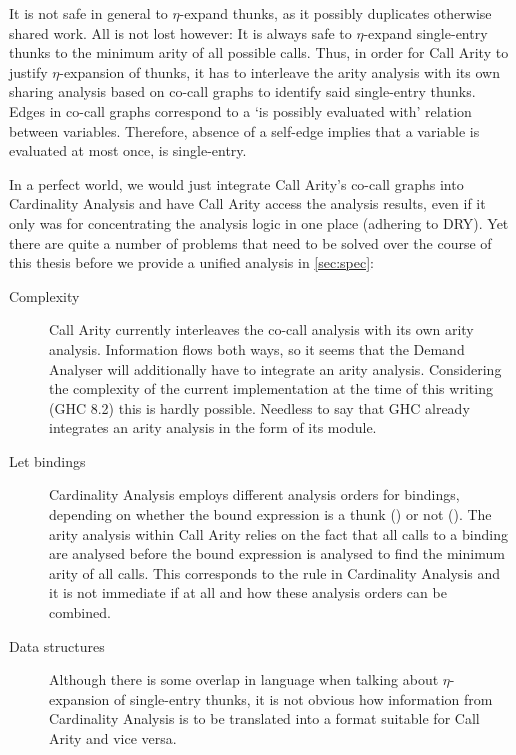 It is not safe in general to $\eta$-expand thunks, as it possibly duplicates otherwise shared work. 
All is not lost however: It is always safe to $\eta$-expand single-entry thunks to the minimum arity of all possible calls.
Thus, in order for Call Arity to justify $\eta$-expansion of thunks, it has to interleave the arity analysis with its own sharing analysis based on co-call graphs \parencite{callarity} to identify said single-entry thunks.
Edges in co-call graphs correspond to a `is possibly evaluated with' relation between variables.
Therefore, absence of a self-edge implies that a variable is evaluated at most once, \eg is single-entry.

In a perfect world, we would just integrate Call Arity's co-call graphs into Cardinality Analysis and have Call Arity access the analysis results, even if it only was for concentrating the analysis logic in one place (adhering to DRY).
Yet there are quite a number of problems that need to be solved over the course of this thesis before we provide a unified analysis in \cref{sec:spec}:
\begin{description}
  \item[Complexity] 
    Call Arity currently interleaves the co-call analysis with its own arity analysis.
    Information flows both ways, so it seems that the Demand Analyser will additionally have to integrate an arity analysis.
    Considering the complexity of the current implementation at the time of this writing (GHC 8.2) this is hardly possible.
    Needless to say that GHC already integrates an arity analysis in the form of its  module.
  \item[Let bindings]
    Cardinality Analysis employs different analysis orders for  bindings, depending on whether the bound expression is a thunk () or not ().
    The arity analysis within Call Arity relies on the fact that all calls to a binding are analysed before the bound expression is analysed to find the minimum arity of all calls.
    This corresponds to the  rule in Cardinality Analysis and it is not immediate if at all and how these analysis orders can be combined.
  \item[Data structures]
    Although there is some overlap in language when talking about $\eta$-expansion of single-entry thunks, it is not obvious how information from Cardinality Analysis is to be translated into a format suitable for Call Arity and vice versa.
\end{description}

